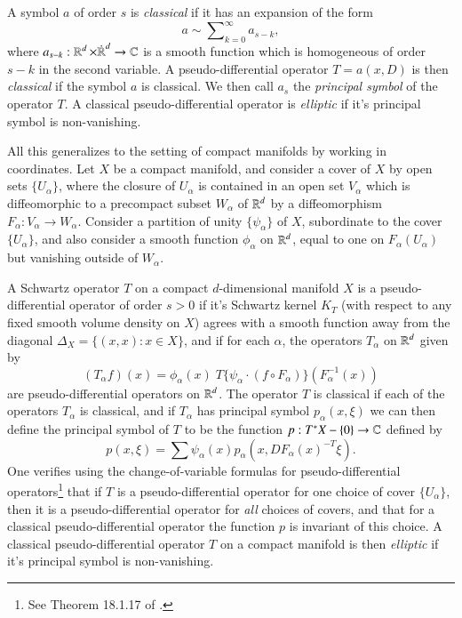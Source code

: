 A symbol $a$ of order $s$ is \emph{classical} if it has an expansion of the form
%
\begin{equation}
    a \sim \sum\nolimits_{k = 0}^\infty a_{s - k},
\end{equation}
%
where $a_{s-k}: \operatorname{\mathbb{R}}^d \times {\dot{\operatorname{\mathbb{R}}}^d} \to \operatorname{\mathbb{C}}$ is a smooth function which is homogeneous of order $s - k$ in the second variable. A pseudo-differential operator $T = a(x,D)$ is then \emph{classical} if the symbol $a$ is classical. We then call $a_s$ the \emph{principal symbol} of the operator $T$. A classical pseudo-differential operator is \emph{elliptic} if it's principal symbol is non-vanishing.

All this generalizes to the setting of compact manifolds by working in coordinates. Let $X$ be a compact manifold, and consider a cover of $X$ by open sets $\{ U_\alpha \}$, where the closure of $U_\alpha$ is contained in an open set $V_\alpha$ which is diffeomorphic to a precompact subset $W_\alpha$ of $\operatorname{\mathbb{R}}^d$ by a diffeomorphism $F_\alpha: V_\alpha \to W_\alpha$. Consider a partition of unity $\{ \psi_\alpha \}$ of $X$, subordinate to the cover $\{ U_\alpha \}$, and also consider a smooth function $\phi_\alpha$ on $\operatorname{\mathbb{R}}^d$, equal to one on $F_\alpha(U_\alpha)$ but vanishing outside of $W_\alpha$.

A Schwartz operator $T$ on a compact $d$-dimensional manifold $X$ is a pseudo-differential operator of order $s > 0$ if it's Schwartz kernel $K_T$ (with respect to any fixed smooth volume density on $X$) agrees with a smooth function away from the diagonal $\Delta_X = \{ (x,x): x \in X \}$, and if for each $\alpha$, the operators $T_\alpha$ on $\operatorname{\mathbb{R}}^d$ given by
%
\begin{equation}
    (T_\alpha f)(x) = \phi_\alpha(x)\; T \{ \psi_\alpha \cdot (f \circ F_\alpha) \} (F_\alpha^{-1}(x))
\end{equation}
%
are pseudo-differential operators on $\operatorname{\mathbb{R}}^d$. The operator $T$ is classical if each of the operators $T_\alpha$ is classical, and if $T_\alpha$ has principal symbol $p_\alpha(x,\xi)$ we can then define the principal symbol of $T$ to be the function $p: T^* X - \{ 0 \} \to \operatorname{\mathbb{C}}$ defined by
%
\begin{equation}
    p(x,\xi) = \sum \psi_\alpha(x) p_\alpha(x, DF_\alpha(x)^{-T} \xi).
\end{equation}
%
One verifies using the change-of-variable formulas for pseudo-differential operators\footnote{See Theorem 18.1.17 of \cite{Hormander3}.} that if $T$ is a pseudo-differential operator for one choice of cover $\{ U_\alpha \}$, then it is a pseudo-differential operator for \emph{all} choices of covers, and that for a classical pseudo-differential operator the function $p$ is invariant of this choice. A classical pseudo-differential operator $T$ on a compact manifold is then \emph{elliptic} if it's principal symbol is non-vanishing.